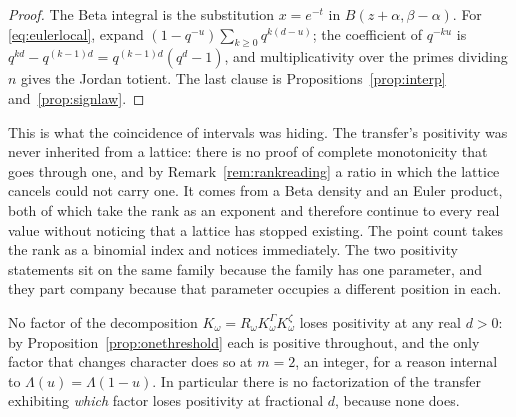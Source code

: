\begin{proof}
The Beta integral is the substitution $x=e^{-t}$ in $B(z+\alpha,\beta-\alpha)$.
For \eqref{eq:eulerlocal}, expand
$(1-q^{-u})\sum_{k\ge0}q^{k(d-u)}$; the coefficient of $q^{-ku}$ is
$q^{kd}-q^{(k-1)d}=q^{(k-1)d}(q^{d}-1)$, and multiplicativity over the primes
dividing $n$ gives the Jordan totient. The last clause is
Propositions~\ref{prop:interp} and~\ref{prop:signlaw}.
\end{proof}

\begin{remark}[Reading]\label{rem:reading}
This is what the coincidence of intervals was hiding. The transfer's positivity
was never inherited from a lattice: there is no proof of complete monotonicity
that goes through one, and by Remark~\ref{rem:rankreading} a ratio in which the
lattice cancels could not carry one. It comes from a Beta density and an Euler
product, both of which take the rank as an exponent and therefore continue to
every real value without noticing that a lattice has stopped existing. The point
count takes the rank as a binomial index and notices immediately. The two
positivity statements sit on the same family because the family has one
parameter, and they part company because that parameter occupies a different
position in each.
\end{remark}

\begin{corollary}\label{cor:nofactorization}
No factor of the decomposition $K_\omega=R_\omega K^\Gamma_\omega K^\zeta_\omega$
loses positivity at any real $d>0$: by
Proposition~\ref{prop:onethreshold} each is positive throughout, and the only
factor that changes character does so at $m=2$, an integer, for a reason internal
to $\Lambda(u)=\Lambda(1-u)$. In particular there is no factorization of the
transfer exhibiting \emph{which} factor loses positivity at fractional $d$,
because none does.
\end{corollary}
